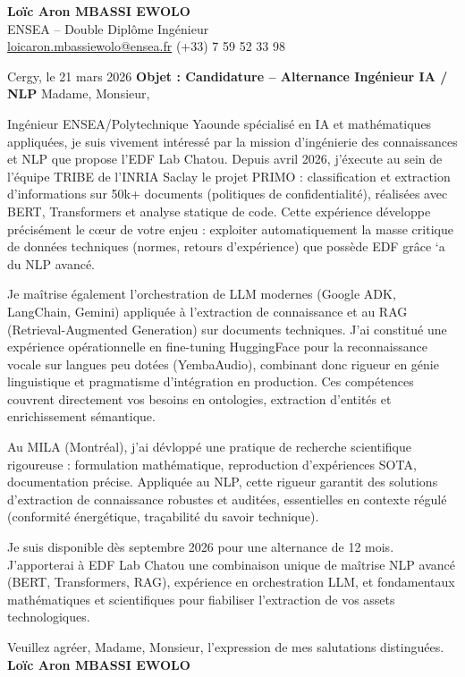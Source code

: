 \documentclass[a4paper,11pt]{article}
\begin{document}
\noindent \textbf{Lo\"ic Aron MBASSI EWOLO} \\
ENSEA -- Double Dipl\^ome Ing\'enieur \\
\href{mailto:loicaron.mbassiewolo@ensea.fr}{loicaron.mbassiewolo@ensea.fr} \quad (+33) 7 59 52 33 98

\vspace{1em}\noindent Cergy, le 21 mars 2026
\vspace{1em}\noindent \textbf{Objet : Candidature -- Alternance Ing\'enieur IA / NLP}
\vspace{1.5em}\noindent Madame, Monsieur,

\vspace{0.8em}\noindent Ing\'enieur ENSEA/Polytechnique Yaounde sp\'ecialis\'e en IA et math\'ematiques appliqu\'ees, je suis vivement intéress\'e par la mission d'ing\'enierie des connaissances et NLP que propose l'EDF Lab Chatou. Depuis avril 2026, j'\'execute au sein de l'\'equipe TRIBE de l'INRIA Saclay le projet PRIMO : classification et extraction d'informations sur 50k+ documents (politiques de confidentialit\'e), r\'ealis\'ees avec BERT, Transformers et analyse statique de code. Cette exp\'erience d\'eveloppe pr\'ecis\'ement le cœur de votre enjeu : exploiter automatiquement la masse critique de donn\'ees techniques (normes, retours d'exp\'erience) que poss\`ede EDF gr\^ace `a du NLP avanc\'e.

\vspace{0.8em}\noindent Je maîtrise également l'orchestration de LLM modernes (Google ADK, LangChain, Gemini) appliquée à l'extraction de connaissance et au RAG (Retrieval-Augmented Generation) sur documents techniques. J'ai constitué une exp\'erience op\'erationnelle en fine-tuning HuggingFace pour la reconnaissance vocale sur langues peu dot\'ees (YembaAudio), combinant donc rigueur en g\'enie linguistique et pragmatisme d'int\'egration en production. Ces comp\'etences couvrent directement vos besoins en ontologies, extraction d'entit\'es et enrichissement s\'emantique.

\vspace{0.8em}\noindent Au MILA (Montréal), j'ai d\'evloppé une pratique de recherche scientifique rigoureuse : formulation math\'ematique, reproduction d'exp\'eriences SOTA, documentation pr\'ecise. Appliquée au NLP, cette rigueur garantit des solutions d'extraction de connaissance robustes et audit\'ees, essentielles en contexte r\'egul\'e (conformit\'e \'energ\'etique, traçabilit\'e du savoir technique).

\vspace{0.8em}\noindent Je suis disponible d\`es septembre 2026 pour une alternance de 12 mois. J'apporterai \`a EDF Lab Chatou une combinaison unique de maîtrise NLP avanc\'e (BERT, Transformers, RAG), exp\'erience en orchestration LLM, et fondamentaux math\'ematiques et scientifiques pour fiabiliser l'extraction de vos assets technologiques.

\vspace{1.5em}\noindent Veuillez agr\'eer, Madame, Monsieur, l'expression de mes salutations distingu\'ees.
\vspace{2em}\noindent \textbf{Lo\"ic Aron MBASSI EWOLO}
\end{document}
